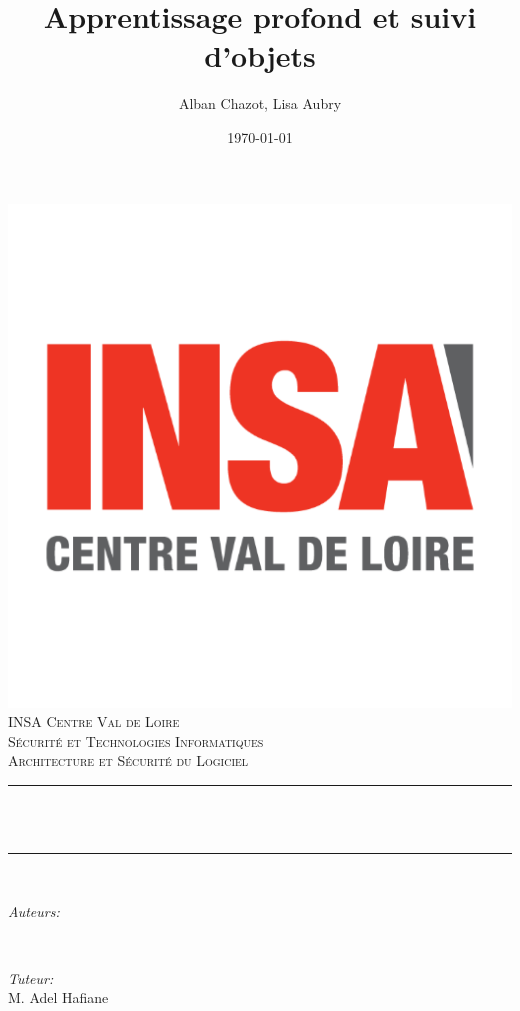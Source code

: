 \documentclass[12pt]{report}
\title{Apprentissage profond et suivi d'objets}								%
\author{Alban Chazot, Lisa Aubry}								%
\date{\today}											%
\title{}
\author{}
\makeatletter
\let\thetitle\@title
\let\theauthor\@author
\let\thedate\@date
\makeatother
\begin{document}

\begin{titlepage}
	\centering
    \vspace*{0.1 cm}
    \includegraphics[scale = 0.25]{INSA}\\[0 cm]	%
    \textsc{\LARGE INSA Centre Val de Loire}\\[2.0 cm]	%
	\textsc{\Large Sécurité et Technologies Informatiques}\\[0.5 cm]
	\textsc{\large Architecture et Sécurité du Logiciel}\\[0.5 cm]
	\rule{\linewidth}{0.2 mm} \\[0.4 cm]
	{ \huge \bfseries \thetitle}\\
	\rule{\linewidth}{0.2 mm} \\[1.5 cm]

	\begin{minipage}{0.4\textwidth}
		\begin{flushleft} \large
			\emph{Auteurs:}\\
			\theauthor
			\end{flushleft}
			\end{minipage}~
			\begin{minipage}{0.4\textwidth}
			\begin{flushright} \large
			\emph{Tuteur:} \\
			M. Adel Hafiane
		\end{flushright}
	\end{minipage}\\[2 cm]

	{\large \thedate}\\[2 cm]

	\vfill

\end{titlepage}
\end{document}
